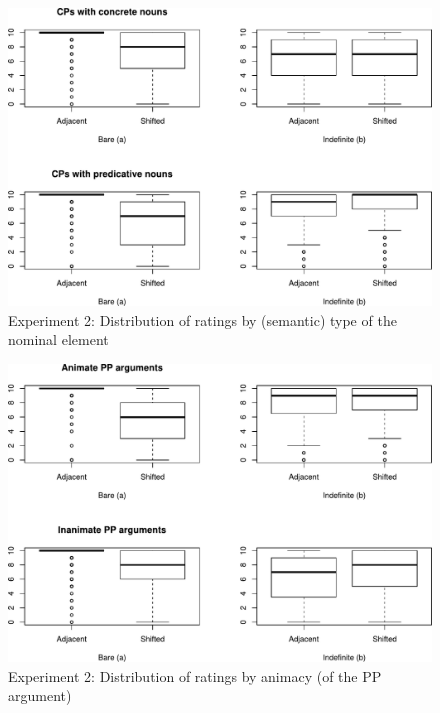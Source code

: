 \documentclass[output=paper]{langsci/langscibook}
\begin{document}
\begin{figure}
	\includegraphics[width=1\linewidth]{plots/Rplot03.pdf}
	\caption{Experiment 2: Distribution of ratings by (semantic) type of the nominal element}\label{boxplot3}
\end{figure}

\begin{figure}
	\includegraphics[width=1\linewidth]{plots/Rplot02-Exp2.pdf}
	\caption{Experiment 2: Distribution of ratings by animacy (of the PP argument)}\label{boxplot5}
\end{figure}
\end{document}
